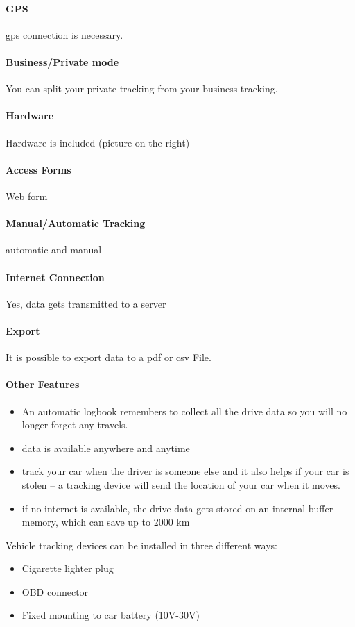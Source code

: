 \paragraph{GPS} \gls{gps} connection is necessary.
\paragraph{Business/Private mode}You can split your private tracking from your business tracking.
\paragraph{Hardware}Hardware is included (picture on the right)
\paragraph{Access Forms}Web form
\paragraph{Manual/Automatic Tracking}automatic and manual
\paragraph{Internet Connection}Yes, data gets transmitted to a server
\paragraph{Export}It is  possible to export data to a \gls{pdf} or \gls{csv} File.
\paragraph{Other Features}
\begin{itemize}
\item An automatic logbook remembers to collect all the drive data so you will no longer forget any travels.
\item data is available anywhere and anytime
\item track your car when the driver is someone else and it also helps if your car is stolen – a tracking device will send the location of your car when it moves.
\item if no internet is available, the drive data gets stored on an internal buffer memory, which can save up to 2000 km
\end{itemize}
Vehicle tracking devices can be installed in three different ways:
\begin{itemize}
\item Cigarette lighter plug
\item OBD connector
\item Fixed mounting to car battery (10V-30V)
\end{itemize}
